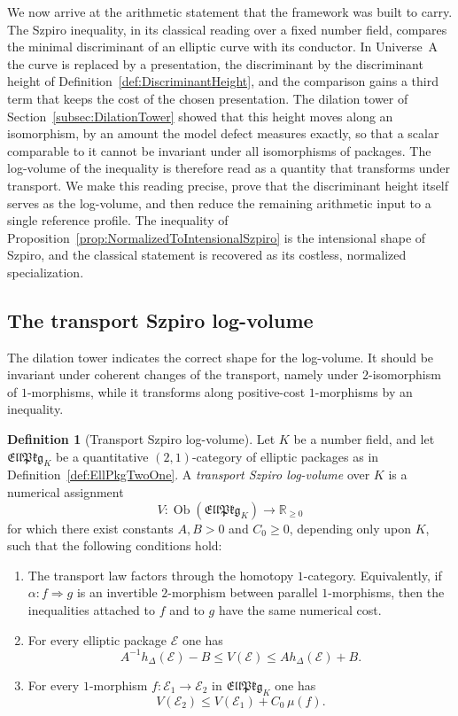 \documentclass[10pt, reqno]{amsart}
\theoremstyle{plain}
\theoremstyle{definition}
\newtheorem{definition}[theorem]{Definition}
\theoremstyle{plain}
\newcommand{\R}{\mathbb{R}}
\begin{document}
We now arrive at the arithmetic statement that the framework was built to carry. The Szpiro inequality, in its classical reading over a fixed number field, compares the minimal discriminant of an elliptic curve with its conductor. In Universe~A the curve is replaced by a presentation, the discriminant by the discriminant height of Definition~\ref{def:DiscriminantHeight}, and the comparison gains a third term that keeps the cost of the chosen presentation. The dilation tower of Section~\ref{subsec:DilationTower} showed that this height moves along an isomorphism, by an amount the model defect measures exactly, so that a scalar comparable to it cannot be invariant under all isomorphisms of packages. The log-volume of the inequality is therefore read as a quantity that transforms under transport. We make this reading precise, prove that the discriminant height itself serves as the log-volume, and then reduce the remaining arithmetic input to a single reference profile. The inequality of Proposition~\ref{prop:NormalizedToIntensionalSzpiro} is the intensional shape of Szpiro, and the classical statement is recovered as its costless, normalized specialization.

\subsection{The transport Szpiro log-volume}\label{subsec:TransportLogVolume}

The dilation tower indicates the correct shape for the log-volume. It should be invariant under coherent changes of the transport, namely under $2$-isomorphism of $1$-morphisms, while it transforms along positive-cost $1$-morphisms by an inequality.

\begin{definition}[Transport Szpiro log-volume]\label{def:TransportSzpiroLogVolume}
Let $K$ be a number field, and let $\mathfrak{EllPkg}_K$ be a quantitative $(2,1)$-category of elliptic packages as in Definition~\ref{def:EllPkgTwoOne}. A \emph{transport Szpiro log-volume} over $K$ is a numerical assignment
\[
  V \colon \operatorname{Ob}(\mathfrak{EllPkg}_K)\longrightarrow \R_{\ge 0}
\]
for which there exist constants $A,B>0$ and $C_0\ge 0$, depending only upon $K$, such that the following conditions hold:
\begin{enumerate}
\item[\textup{(i)}] The transport law factors through the homotopy $1$-category. Equivalently, if $\alpha \colon f \Rightarrow g$ is an invertible $2$-morphism between parallel $1$-morphisms, then the inequalities attached to $f$ and to $g$ have the same numerical cost.
\item[\textup{(ii)}] For every elliptic package $\mathcal{E}$ one has
\[
  A^{-1}h_\Delta(\mathcal{E})-B
  \le
  V(\mathcal{E})
  \le
  Ah_\Delta(\mathcal{E})+B.
\]
\item[\textup{(iii)}] For every $1$-morphism $f\colon\mathcal{E}_1\to\mathcal{E}_2$ in $\mathfrak{EllPkg}_K$ one has
\[
  V(\mathcal{E}_2)
  \le
  V(\mathcal{E}_1)+C_0\,\mu(f).
\]
\end{enumerate}
\end{definition}
\end{document}
